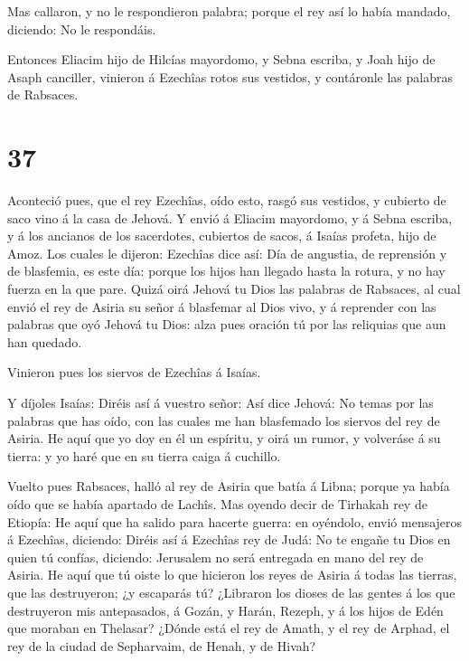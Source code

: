  Mas callaron, y no le respondieron palabra; porque el rey
así lo había mandado, diciendo: No le respondáis.

 Entonces Eliacim hijo de Hilcías mayordomo, y Sebna
escriba, y Joah hijo de Asaph canciller, vinieron á Ezechîas rotos sus
vestidos, y contáronle las palabras de Rabsaces.

\hypertarget{section-36}{%
\section{37}\label{section-36}}

 Aconteció pues, que el rey Ezechîas, oído esto, rasgó sus
vestidos, y cubierto de saco vino á la casa de Jehová.  Y
envió á Eliacim mayordomo, y á Sebna escriba, y á los ancianos de los
sacerdotes, cubiertos de sacos, á Isaías profeta, hijo de Amoz.
 Los cuales le dijeron: Ezechîas dice así: Día de angustia,
de reprensión y de blasfemia, es este día: porque los hijos han llegado
hasta la rotura, y no hay fuerza en la que pare.  Quizá oirá
Jehová tu Dios las palabras de Rabsaces, al cual envió el rey de Asiria
su señor á blasfemar al Dios vivo, y á reprender con las palabras que
oyó Jehová tu Dios: alza pues oración tú por las reliquias que aun han
quedado.

 Vinieron pues los siervos de Ezechîas á Isaías.

 Y díjoles Isaías: Diréis así á vuestro señor: Así dice
Jehová: No temas por las palabras que has oído, con las cuales me han
blasfemado los siervos del rey de Asiria.  He aquí que yo
doy en él un espíritu, y oirá un rumor, y volveráse á su tierra: y yo
haré que en su tierra caiga á cuchillo.

 Vuelto pues Rabsaces, halló al rey de Asiria que batía á
Libna; porque ya había oído que se había apartado de Lachîs.
 Mas oyendo decir de Tirhakah rey de Etiopía: He aquí que ha
salido para hacerte guerra: en oyéndolo, envió mensajeros á Ezechîas,
diciendo:  Diréis así á Ezechîas rey de Judá: No te engañe
tu Dios en quien tú confías, diciendo: Jerusalem no será entregada en
mano del rey de Asiria.  He aquí que tú oiste lo que
hicieron los reyes de Asiria á todas las tierras, que las destruyeron;
¿y escaparás tú?  ¿Libraron los dioses de las gentes á los
que destruyeron mis antepasados, á Gozán, y Harán, Rezeph, y á los hijos
de Edén que moraban en Thelasar?  ¿Dónde está el rey de
Amath, y el rey de Arphad, el rey de la ciudad de Sepharvaim, de Henah,
y de Hivah?

